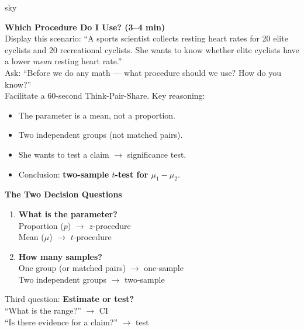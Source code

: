 \documentclass[10pt]{article}
\begin{document}
\begin{skillbox}[Hook]{sky}
\begin{minipage}[t]{0.55\linewidth}
    \textbf{Which Procedure Do I Use? (3--4 min)}\\
    Display this scenario: ``A sports scientist collects resting heart rates for 20 elite
    cyclists and 20 recreational cyclists. She wants to know whether elite cyclists have a
    lower \emph{mean} resting heart rate.''\\[4pt]
    Ask: ``Before we do any math --- what procedure should we use? How do you know?''\\[4pt]
    Facilitate a 60-second Think-Pair-Share. Key reasoning:
    \begin{itemize}
        \item The parameter is a mean, not a proportion.
        \item Two independent groups (not matched pairs).
        \item She wants to test a claim $\to$ significance test.
        \item Conclusion: \textbf{two-sample $t$-test for $\mu_1-\mu_2$}.
    \end{itemize}
\end{minipage}
\hfill
\begin{minipage}[t]{0.40\linewidth}
    \textbf{The Two Decision Questions}
    \begin{enumerate}
        \item \textbf{What is the parameter?}\\
              Proportion ($p$) $\to$ $z$-procedure\\
              Mean ($\mu$) $\to$ $t$-procedure
        \item \textbf{How many samples?}\\
              One group (or matched pairs) $\to$ one-sample\\
              Two independent groups $\to$ two-sample
    \end{enumerate}
    \medskip
    Third question: \textbf{Estimate or test?}\\
    ``What is the range?'' $\to$ CI\\
    ``Is there evidence for a claim?'' $\to$ test
\end{minipage}
\end{skillbox}
\end{document}
